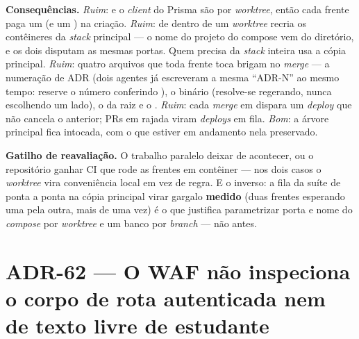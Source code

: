 \textbf{Consequências.} \emph{Ruim}:  e o \emph{client} do
Prisma são por \emph{worktree}, então cada frente paga um  (e
um ) na criação. \emph{Ruim}:  de
dentro de um \emph{worktree} recria os contêineres da \emph{stack} principal
--- o nome do projeto do compose vem do diretório, e os dois disputam as mesmas
portas. Quem precisa da \emph{stack} inteira usa a cópia principal.
\emph{Ruim}: quatro arquivos que toda frente toca brigam no \emph{merge}
--- a numeração de ADR (dois agentes já escreveram a mesma \enquote{ADR-N}
ao mesmo tempo: reserve o número conferindo ), o
 binário (resolve-se regerando, nunca escolhendo um lado), o
 da raiz e o . \emph{Ruim}: cada
\emph{merge} em  dispara um \emph{deploy} que não cancela o anterior;
PRs em rajada viram \emph{deploys} em fila. \emph{Bom}: a árvore principal
fica intocada, com o que estiver em andamento nela preservado.

\textbf{Gatilho de reavaliação.} O trabalho paralelo deixar de acontecer, ou o
repositório ganhar CI que rode as frentes em contêiner --- nos dois casos o
\emph{worktree} vira conveniência local em vez de regra. E o inverso: a fila
da suíte de ponta a ponta na cópia principal virar gargalo \textbf{medido} (duas
frentes esperando uma pela outra, mais de uma vez) é o que justifica
parametrizar porta e nome do \emph{compose} por \emph{worktree} e um banco por
\emph{branch} --- não antes.

\section{ADR-62 --- O WAF não inspeciona o corpo de rota autenticada nem de
texto livre de estudante}
\label{adr:waf-excecoes}

